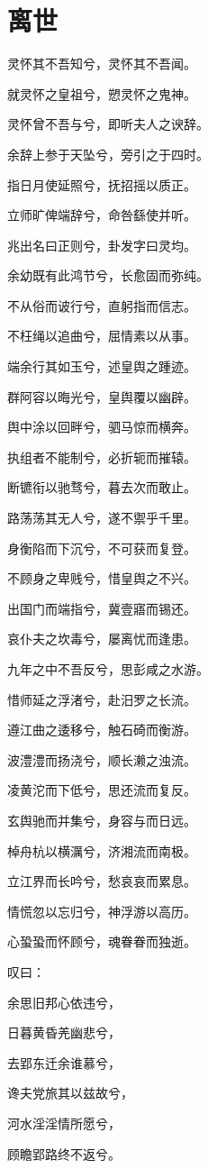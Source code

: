 \documentclass[UTF8,titlepage,oneside]{ctexbook}
\begin{document}
\section*{离世}
\begin{center}
	
	灵怀其不吾知兮，灵怀其不吾闻。
	
	就灵怀之皇祖兮，愬灵怀之鬼神。
	
	灵怀曾不吾与兮，即听夫人之谀辞。
	
	余辞上参于天坠兮，旁引之于四时。
	
	指日月使延照兮，抚招摇以质正。
	
	立师旷俾端辞兮，命咎繇使并听。
	
	兆出名曰正则兮，卦发字曰灵均。
	
	余幼既有此鸿节兮，长愈固而弥纯。
	
	不从俗而诐行兮，直躬指而信志。
	
	不枉绳以追曲兮，屈情素以从事。
	
	端余行其如玉兮，述皇舆之踵迹。
	
	群阿容以晦光兮，皇舆覆以幽辟。
	
	舆中涂以回畔兮，驷马惊而横奔。
	
	执组者不能制兮，必折轭而摧辕。
	
	断镳衔以驰骛兮，暮去次而敢止。
	
	路荡荡其无人兮，遂不禦乎千里。
	
	身衡陷而下沉兮，不可获而复登。
	
	不顾身之卑贱兮，惜皇舆之不兴。
	
	出国门而端指兮，冀壹寤而锡还。
	
	哀仆夫之坎毒兮，屡离忧而逢患。
	
	九年之中不吾反兮，思彭咸之水游。
	
	惜师延之浮渚兮，赴汨罗之长流。
	
	遵江曲之逶移兮，触石碕而衡游。
	
	波澧澧而扬浇兮，顺长濑之浊流。
	
	凌黄沱而下低兮，思还流而复反。
	
	玄舆驰而并集兮，身容与而日远。
	
	棹舟杭以横濿兮，济湘流而南极。
	
	立江界而长吟兮，愁哀哀而累息。
	
	情慌忽以忘归兮，神浮游以高历。
	
	心蛩蛩而怀顾兮，魂眷眷而独逝。
	
	叹曰：
	
	余思旧邦心依违兮，
	
	日暮黄昏羌幽悲兮，
	
	去郢东迁余谁慕兮，
	
	谗夫党旅其以兹故兮，
	
	河水淫淫情所愿兮，
	
	顾瞻郢路终不返兮。
	
	
\end{center}
\end{document}
